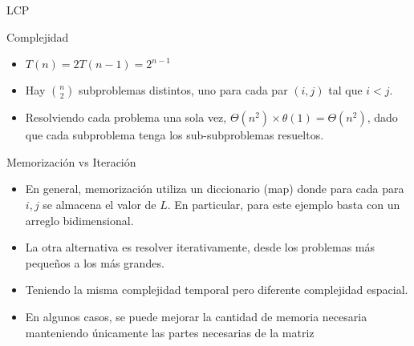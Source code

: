 \documentclass[]{beamer}
\begin{document}
\begin{frame}{LCP}
  \begin{algorithm}[H]
    \BlankLine
    {
    }
    {
    } 
  \end{algorithm}
\end{frame}

\begin{frame}{Complejidad}
  \begin{itemize}
    \item $T(n) = 2T(n-1) = 2^{n-1}$ 
      \pause
    \item Hay $\binom{n}{2}$ subproblemas distintos, uno para cada par $(i,j)$ tal que $i<j$. 
      \pause
    \item Resolviendo cada problema una sola vez, $\Theta(n^2) \times \theta(1) = \Theta(n^2)$, dado que cada subproblema tenga los sub-subproblemas resueltos.
  \end{itemize}
\end{frame}

\begin{frame}{Memorizaci\'on vs Iteraci\'on}
  \begin{itemize}
    \item En general, memorizaci\'on utiliza un diccionario (map) donde para cada para $i,j$ se almacena el valor de $L$. En particular, para este ejemplo basta con un arreglo bidimensional.
      \pause
    \item La otra alternativa es resolver iterativamente, desde los problemas m\'as peque\~nos a los m\'as grandes.
      \pause
    \item Teniendo la misma complejidad temporal pero diferente complejidad espacial.
      \pause
    \item En algunos casos, se puede mejorar la cantidad de memoria necesaria manteniendo \'unicamente las partes necesarias de la matriz
  \end{itemize}
\end{frame}

\end{document}
